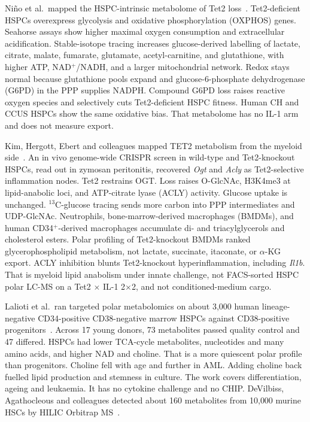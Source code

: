 \documentclass[11pt]{article}
\begin{document}
Ni{\~n}o et al.\ mapped the HSPC-intrinsic metabolome of Tet2
loss~\cite{Nino2026TETmetabolism}. Tet2-deficient HSPCs overexpress glycolysis and
oxidative phosphorylation (OXPHOS) genes. Seahorse assays show higher maximal oxygen
consumption and extracellular acidification. Stable-isotope tracing increases
glucose-derived labelling of lactate, citrate, malate, fumarate, glutamate,
acetyl-carnitine, and glutathione, with higher ATP, NAD$^{+}$/NADH, and a larger
mitochondrial network. Redox stays normal because glutathione pools expand and
glucose-6-phosphate dehydrogenase (G6PD) in the PPP supplies NADPH. Compound G6PD loss
raises reactive oxygen species and selectively cuts Tet2-deficient HSPC fitness. Human
CH and CCUS HSPCs show the same oxidative bias. That metabolome has no IL-1 arm and does
not measure export.

Kim, Hergott, Ebert and colleagues mapped TET2 metabolism from the myeloid
side~\cite{Kim2026TET2metabolism}. An in vivo genome-wide CRISPR screen in wild-type and
Tet2-knockout HSPCs, read out in zymosan peritonitis, recovered \textit{Ogt} and
\textit{Acly} as Tet2-selective inflammation nodes. Tet2 restrains OGT. Loss raises
O-GlcNAc, H3K4me3 at lipid-anabolic loci, and ATP-citrate lyase (ACLY) activity. Glucose
uptake is unchanged. $^{13}$C-glucose tracing sends more carbon into PPP intermediates
and UDP-GlcNAc. Neutrophils, bone-marrow-derived macrophages (BMDMs), and human
CD34$^{+}$-derived macrophages accumulate di- and triacylglycerols and cholesterol
esters. Polar profiling of Tet2-knockout BMDMs ranked glycerophospholipid metabolism,
not lactate, succinate, itaconate, or $\alpha$-KG export. ACLY inhibition blunts
Tet2-knockout hyperinflammation, including \textit{Il1b}. That is myeloid lipid
anabolism under innate challenge, not FACS-sorted HSPC polar LC-MS on a Tet2 $\times$
IL-1 2$\times$2, and not conditioned-medium cargo.

Lalioti et al.\ ran targeted polar metabolomics on about 3{,}000 human
lineage-negative CD34-positive CD38-negative marrow HSPCs against CD38-positive
progenitors~\cite{Lalioti2025HSCmetabolome}. Across 17 young donors, 73 metabolites
passed quality control and 47 differed. HSPCs had lower TCA-cycle metabolites,
nucleotides and many amino acids, and higher NAD and choline. That is a more quiescent
polar profile than progenitors. Choline fell with age and further in AML. Adding
choline back fuelled lipid production and stemness in culture. The work covers
differentiation, ageing and leukaemia. It has no cytokine challenge and no CHIP.
DeVilbiss, Agathocleous and colleagues detected about 160 metabolites from 10{,}000
murine HSCs by HILIC Orbitrap MS~\cite{DeVilbiss2021HSCmetabolome}.
\end{document}
